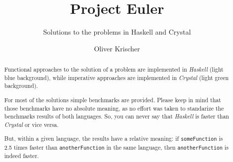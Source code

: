 \documentclass{scrreprt}
\numberwithin{equation}{chapter}
\begin{document}
\title{Project Euler}
\author{Oliver Krischer}
\subtitle{Solutions to the problems in Haskell and Crystal}
\maketitle
\begin{abstract}
  Functional approaches to the solution of a problem are implemented in \emph{Haskell} (light blue background), while imperative approaches are implemented in \emph{Crystal} (light green background).

  For most of the solutions simple benchmarks are provided.
  Please keep in mind that those benchmarks have no absolute meaning, as no effort was taken to standarize the benchmarks results of both languages.
  So, you can never say that \emph{Haskell} is faster than \emph{Crystal} or vice versa.

  But, within a given language, the results have a relative meaning: if \texttt{someFunction} is 2.5 times faster than \texttt{anotherFunction} in the same language, then \texttt{anotherFunction} is indeed faster.
\end{abstract}
\tableofcontents





\end{document}
